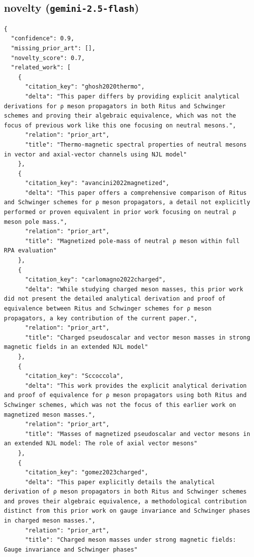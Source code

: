 \documentclass[11pt]{article}
\begin{document}
\subsection*{novelty (\texttt{gemini-2.5-flash})}
\begin{verbatim}
{
  "confidence": 0.9,
  "missing_prior_art": [],
  "novelty_score": 0.7,
  "related_work": [
    {
      "citation_key": "ghosh2020thermo",
      "delta": "This paper differs by providing explicit analytical derivations for ρ meson propagators in both Ritus and Schwinger schemes and proving their algebraic equivalence, which was not the focus of previous work like this one focusing on neutral mesons.",
      "relation": "prior_art",
      "title": "Thermo-magnetic spectral properties of neutral mesons in vector and axial-vector channels using NJL model"
    },
    {
      "citation_key": "avancini2022magnetized",
      "delta": "This paper offers a comprehensive comparison of Ritus and Schwinger schemes for ρ meson propagators, a detail not explicitly performed or proven equivalent in prior work focusing on neutral ρ meson pole mass.",
      "relation": "prior_art",
      "title": "Magnetized pole-mass of neutral ρ meson within full RPA evaluation"
    },
    {
      "citation_key": "carlomagno2022charged",
      "delta": "While studying charged meson masses, this prior work did not present the detailed analytical derivation and proof of equivalence between Ritus and Schwinger schemes for ρ meson propagators, a key contribution of the current paper.",
      "relation": "prior_art",
      "title": "Charged pseudoscalar and vector meson masses in strong magnetic fields in an extended NJL model"
    },
    {
      "citation_key": "Sccoccola",
      "delta": "This work provides the explicit analytical derivation and proof of equivalence for ρ meson propagators using both Ritus and Schwinger schemes, which was not the focus of this earlier work on magnetized meson masses.",
      "relation": "prior_art",
      "title": "Masses of magnetized pseudoscalar and vector mesons in an extended NJL model: The role of axial vector mesons"
    },
    {
      "citation_key": "gomez2023charged",
      "delta": "This paper explicitly details the analytical derivation of ρ meson propagators in both Ritus and Schwinger schemes and proves their algebraic equivalence, a methodological contribution distinct from this prior work on gauge invariance and Schwinger phases in charged meson masses.",
      "relation": "prior_art",
      "title": "Charged meson masses under strong magnetic fields: Gauge invariance and Schwinger phases"

\end{verbatim}
\end{document}
